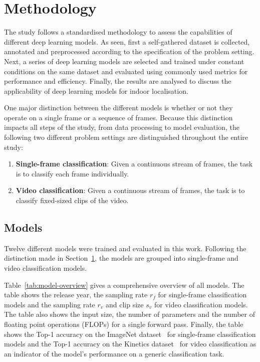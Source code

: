 \documentclass[a4paper]{article}
\begin{document}
\section{Methodology} %
\label{sec:methodology}

The study follows a standardised methodology to assess the capabilities of
different deep learning models. As seen, first a self-gathered dataset is
collected, annotated and preprocessed according to the specification of the
problem setting. Next, a series of deep learning models are selected and trained
under constant conditions on the same dataset and evaluated using commonly used
metrics for performance and efficiency. Finally, the results are analysed to
discuss the applicability of deep learning models for indoor localisation.

One major distinction between the different models is whether or not they
operate on a single frame or a sequence of frames. Because this distinction
impacts all steps of the study, from data processing to model evaluation, the
following two different problem settings are distinguished throughout the entire
study:

\begin{enumerate}

\item \textbf{Single-frame classification}: Given a continuous stream of frames,
  the task is to classify each frame individually.

\item \textbf{Video classification}: Given a continuous stream of frames, the
  task is to classify fixed-sized clips of the video.

\end{enumerate}


\subsection{Models} %
\label{sub:models}


Twelve different models were trained and evaluated in this work. Following the
distinction made in Section~\ref{sec:methodology}, the models are grouped into
single-frame and video classification models. 

Table~\ref{tab:model-overview} gives a comprehensive overview of all models. The
table shows the release year, the sampling rate $r_f$ for single-frame
classification models and the sampling rate $r_v$ and clip size $s_v$ for video
classification models. The table also shows the input size, the number of
parameters and the number of floating point operations (FLOPs) for a single
forward pass. Finally, the table shows the Top-1 accuracy on the ImageNet
dataset~\cite{imagenet} for single-frame classification models and the Top-1
accuracy on the Kinetics dataset~\cite{kinetics} for video classification as an
indicator of the model's performance on a generic classification task.
\end{document}
